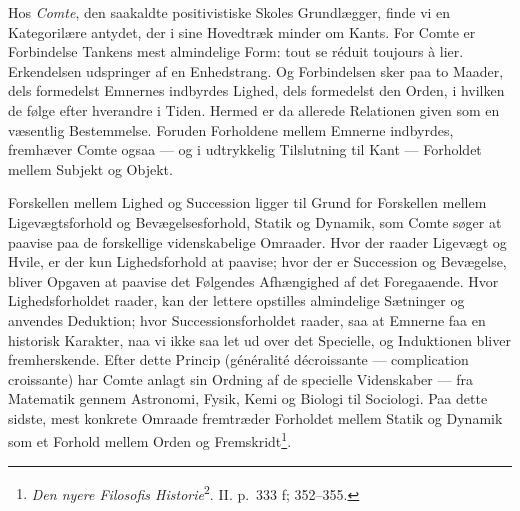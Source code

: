 \documentclass[12pt,a4paper]{book}
\begin{document}
Hos \emph{Comte}, den saakaldte positivistiske Skoles Grundlægger, finde vi
en Kategorilære antydet, der i sine Hovedtræk minder om Kants. For Comte er
Forbindelse Tankens mest almindelige Form: tout se réduit toujours à lier.
Erkendelsen udspringer af en Enhedstrang. Og Forbindelsen sker paa to
Maader, dels formedelst Emnernes indbyrdes Lighed, dels formedelst den
Orden, i hvilken de følge efter hverandre i Tiden. Hermed er da allerede
Relationen given som en væsentlig Bestemmelse. Foruden Forholdene mellem
Emnerne indbyrdes, fremhæver Comte ogsaa --- og i udtrykkelig Tilslutning
til Kant --- Forholdet mellem Subjekt og Objekt.

Forskellen mellem Lighed og Succession ligger til Grund for Forskellen
mellem Ligevægtsforhold og Bevægelsesforhold, Statik og Dynamik, som Comte
søger at paavise paa de forskellige videnskabelige Omraader. Hvor der raader
Ligevægt og Hvile, er der kun Lighedsforhold at paavise; hvor der er
Succession og Bevægelse, bliver Opgaven at paavise det Følgendes
Afhængighed af det Foregaaende. Hvor Lighedsforholdet raader, kan der
lettere opstilles almindelige Sætninger og anvendes Deduktion; hvor
Successionsforholdet raader, saa at Emnerne faa en historisk Karakter, naa
vi ikke saa let ud over det Specielle, og Induktionen bliver fremherskende.
Efter dette Princip (généralité décroissante --- complication croissante)
har Comte anlagt sin Ordning af de specielle Videnskaber --- fra Matematik
gennem Astronomi, Fysik, Kemi og Biologi til Sociologi. Paa dette sidste,
mest konkrete Omraade fremtræder Forholdet mellem Statik og Dynamik som et
Forhold mellem Orden og Fremskridt\footnote{\emph{Den nyere Filosofis Historie}\textsuperscript{2}. II. p.~333 f; 352--355.}.
\end{document}
